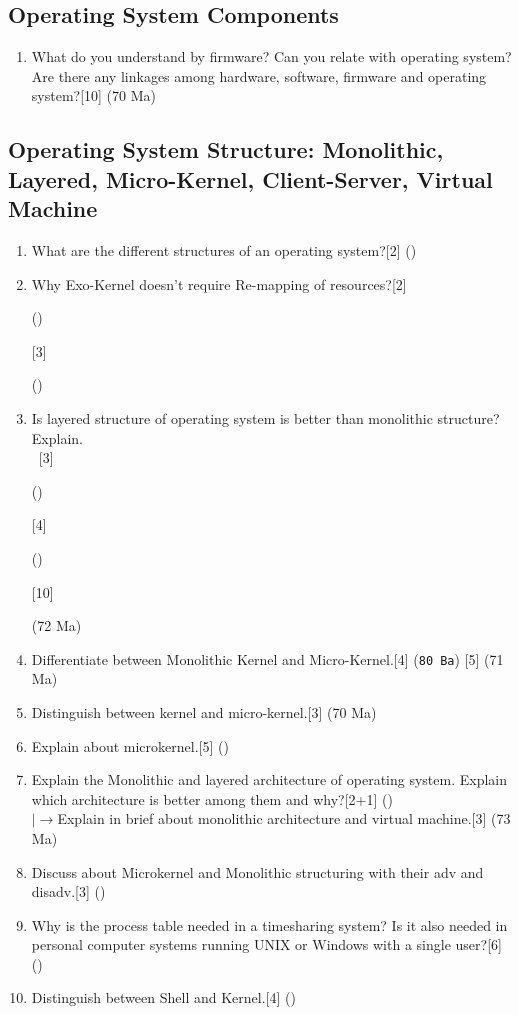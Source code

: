 \documentclass[12pt]{article}
\newcommand{\lb}{\left|\rightarrow\right.}
\newcommand{\enter}{\textcolor{white}{1}}\ExplSyntaxOn
\begin{document}
\subsection{Operating System Components}
\begin{enumerate}
\item What do you understand by firmware? Can you relate with operating system? Are there any linkages among hardware, software, firmware and operating system?\hfill[10] (70 Ma)
\end{enumerate}
\subsection{Operating System Structure: Monolithic, Layered, Micro-Kernel, Client-Server, Virtual Machine}
\begin{enumerate}
\item What are the different structures of an operating system?\hfill[2] ()
\item Why Exo-Kernel doesn't require Re-mapping of resources?\hfill[2] \begin{small}()\end{small} [3] \begin{small}()\end{small}
\item Is layered structure of operating system is better than monolithic structure? Explain.\\
\enter \hfill[3] \begin{small}()\end{small} [4] \begin{small}()\end{small} [10] \begin{small}(72 Ma)\end{small}
\item Differentiate between Monolithic Kernel and Micro-Kernel.\hfill[4] (\texttt{80 Ba}) [5] (71 Ma)
\item Distinguish between kernel and micro-kernel.\hfill[3] (70 Ma)
\item Explain about microkernel.\hfill[5] ()
\item Explain the Monolithic and layered architecture of operating system. Explain which architecture is better among them and why?\hspace{6.7cm}[2+1] ()\\
$\lb$Explain in brief about monolithic architecture and virtual machine.\hfill[3] (73 Ma)
\item Discuss about Microkernel and Monolithic structuring with their adv and disadv.[3] () 
\item Why is the process table needed in a timesharing system? Is it also needed in personal computer systems running UNIX or Windows with a single user?\hfill[6] ()
\item Distinguish between Shell and Kernel.\hfill[4] ()
\end{enumerate}
\end{document}

